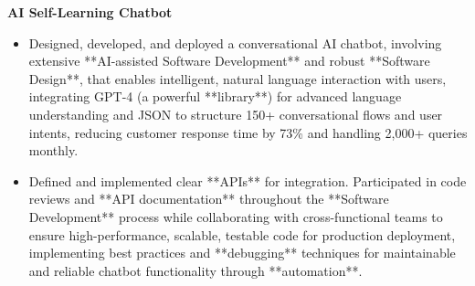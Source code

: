 \documentclass[a4paper,10pt]{article}
\begin{document}
\vspace{-2mm}
\textbf{AI Self-Learning Chatbot} \\
\begin{itemize}[leftmargin=*, itemsep=0pt, parsep=1pt]
\vspace{-7mm}
    \item Designed, developed, and deployed a conversational AI chatbot, involving extensive **AI-assisted Software Development** and robust **Software Design**, that enables intelligent, natural language interaction with users, integrating GPT-4 (a powerful **library**) for advanced language understanding and JSON to structure 150+ conversational flows and user intents, reducing customer response time by 73\% and handling 2,000+ queries monthly.
    \item Defined and implemented clear **APIs** for integration. Participated in code reviews and **API documentation** throughout the **Software Development** process while collaborating with cross-functional teams to ensure high-performance, scalable, testable code for production deployment, implementing best practices and **debugging** techniques for maintainable and reliable chatbot functionality through **automation**.
\end{itemize}

\vspace{-2mm}
\end{document}
